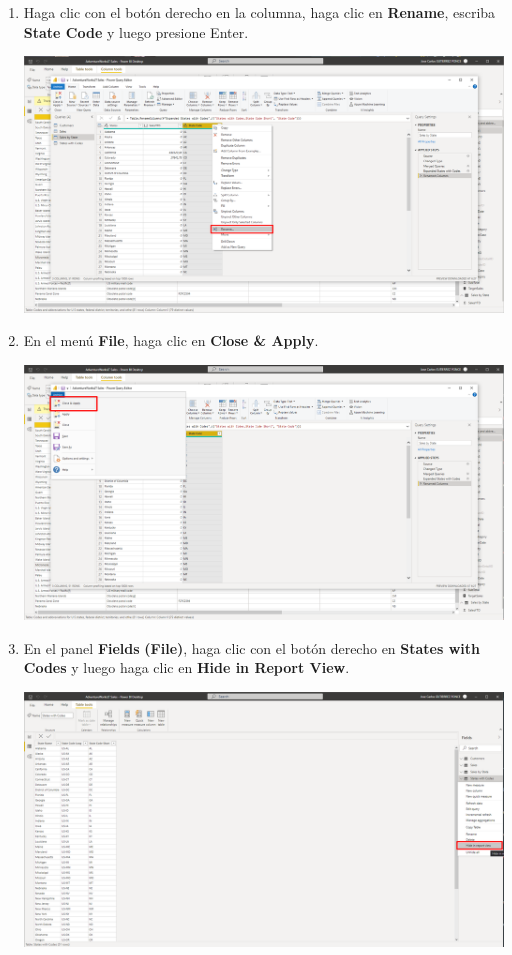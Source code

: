 \documentclass[12pt,letterpaper]{article}
\newcommand\tab[1][1cm]{\hspace*{#1}}
\begin{document}
\begin{enumerate}[\tab 1.]
\begin{center}
        \end{center}
        \item Haga clic con el botón derecho en la columna, haga clic en \textbf{Rename}, escriba \textbf{State Code} y luego presione Enter.
        \begin{center}
            \includegraphics[width=13cm]{./img/img74.png}
        \end{center}
        \item En el menú \textbf{File}, haga clic en \textbf{Close \& Apply}.
        \begin{center}
            \includegraphics[width=13cm]{./img/img75.png}
        \end{center}
        \item En el panel \textbf{Fields} \textbf{(File)}, haga clic con el botón derecho en \textbf{States with Codes} y luego haga clic en \textbf{Hide in Report View}.
        \begin{center}
            \includegraphics[width=13cm]{./img/img76.png}
        \end{center}
    \end{enumerate}
\end{document}

